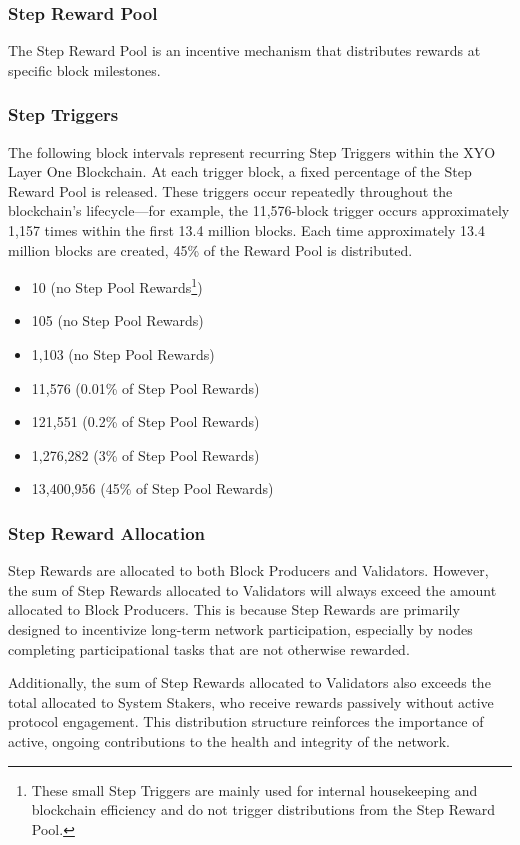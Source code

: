 \documentclass{article}
\begin{document}
\subsubsection{Step Reward Pool}
The Step Reward Pool is an incentive mechanism that distributes rewards at specific block milestones.

\subsubsection{Step Triggers}
The following block intervals represent recurring Step Triggers within the XYO Layer One Blockchain. At each trigger block, a fixed percentage of the Step Reward Pool is released. These triggers occur repeatedly throughout the blockchain's lifecycle—for example, the 11,576-block trigger occurs approximately 1,157 times within the first 13.4 million blocks. Each time approximately 13.4 million blocks are created, 45\% of the Reward Pool is distributed.

\begin{itemize}
    \item 10 (no Step Pool Rewards\footnote{These small Step Triggers are mainly used for internal housekeeping and blockchain efficiency and do not trigger distributions from the Step Reward Pool.})
    \item 105 (no Step Pool Rewards)
    \item 1,103 (no Step Pool Rewards)
    \item 11,576 (0.01\% of Step Pool Rewards)
    \item 121,551 (0.2\% of Step Pool Rewards)
    \item 1,276,282 (3\% of Step Pool Rewards)
    \item 13,400,956 (45\% of Step Pool Rewards)
\end{itemize}

\subsubsection{Step Reward Allocation}
Step Rewards are allocated to both Block Producers and Validators. However, the sum of Step Rewards allocated to Validators will always exceed the amount allocated to Block Producers. This is because Step Rewards are primarily designed to incentivize long-term network participation, especially by nodes completing participational tasks that are not otherwise rewarded. 

Additionally, the sum of Step Rewards allocated to Validators also exceeds the total allocated to System Stakers, who receive rewards passively without active protocol engagement. This distribution structure reinforces the importance of active, ongoing contributions to the health and integrity of the network.
\end{document}
